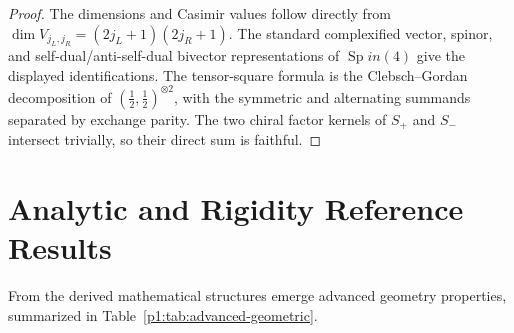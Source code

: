 \documentclass[11pt]{article}
\begin{document}
\begin{proof}
The dimensions and Casimir values follow directly from
\(\dim V_{j_L,j_R}=(2j_L+1)(2j_R+1)\).  The standard complexified vector,
spinor, and self-dual/anti-self-dual bivector representations of
\(\operatorname{Sp}in(4)\) give the displayed identifications.  The tensor-square formula
is the Clebsch--Gordan decomposition of
\((\tfrac12,\tfrac12)^{\otimes2}\), with the symmetric and alternating
summands separated by exchange parity.  The two chiral factor kernels of
\(S_+\) and \(S_-\) intersect trivially, so their direct sum is faithful.
\end{proof}


\part{Analytic and Rigidity Reference Results}
\label{p1:part:advanced-geometry}

From the derived mathematical structures emerge advanced geometry properties, summarized in Table~\ref{p1:tab:advanced-geometric}.
\end{document}
